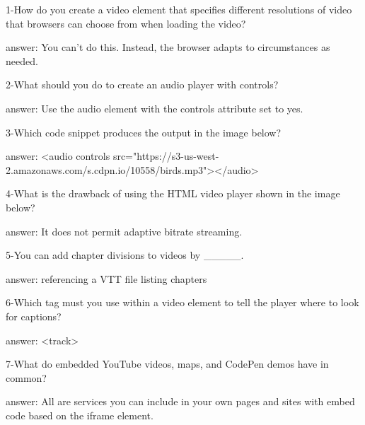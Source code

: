 1-How do you create a video element that specifies different resolutions of video that browsers can choose from when loading the video?

answer: You can't do this. Instead, the browser adapts to circumstances as needed.

2-What should you do to create an audio player with controls?

answer: Use the audio element with the controls attribute set to yes.

3-Which code snippet produces the output in the image below? 

answer: <audio controls src="https://s3-us-west-2.amazonaws.com/s.cdpn.io/10558/birds.mp3"></audio>

4-What is the drawback of using the HTML video player shown in the image below? 

answer: It does not permit adaptive bitrate streaming.

5-You can add chapter divisions to videos by _____.

answer: referencing a VTT file listing chapters

6-Which tag must you use within a video element to tell the player where to look for captions?

answer: <track>

7-What do embedded YouTube videos, maps, and CodePen demos have in common?

answer: All are services you can include in your own pages and sites with embed code based on the iframe element.
 